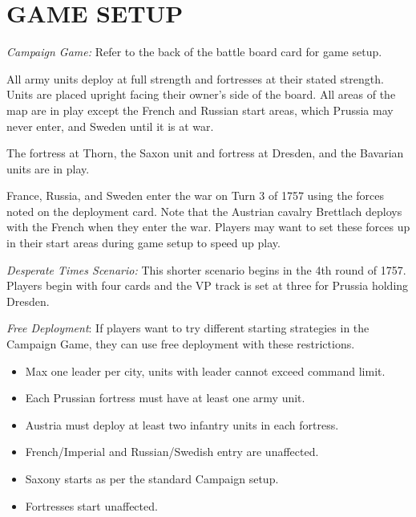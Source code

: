 \section{GAME SETUP}

\textit{Campaign Game:} Refer to the back of the battle board card
for game setup.

All army units deploy at full strength and fortresses at their stated strength. Units are placed upright facing their owner’s side of the board. All areas of the map are in play except the French and Russian start areas, which Prussia may never enter, and Sweden until it is at war.

The fortress at Thorn, the Saxon unit and fortress at Dresden, and the Bavarian units are in play.

France, Russia, and Sweden enter the war on Turn 3 of 1757 using the forces noted on the deployment card. Note that the Austrian cavalry Brettlach deploys with the French when they enter the war. Players may want to set these forces up in their start areas during game setup to speed up play.

\textit{Desperate Times Scenario:} This shorter scenario begins in the 4th round of 1757. Players begin with four cards and the VP track is set at three for Prussia holding Dresden.

\textit{Free Deployment}: If players want to try different starting strategies in the Campaign Game, they can use free deployment with these restrictions.

\begin{itemize}
  \setlength\itemsep{-0.5em}
  \item Max one leader per city, units with leader cannot exceed command limit.
  \item Each Prussian fortress must have at least one army unit.
  \item Austria must deploy at least two infantry units in each fortress.
  \item French/Imperial and Russian/Swedish entry are unaffected.
  \item Saxony starts as per the standard Campaign setup.
  \item Fortresses start unaffected.
\end{itemize}